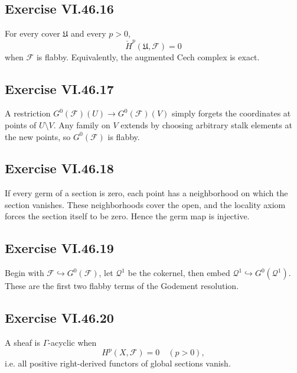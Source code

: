 \subsection*{Exercise VI.46.16}
\begin{solution}
For every cover \(\mathfrak U\) and every \(p>0\),
\[
\check H^p(\mathfrak U,\mathcal F)=0
\]
when \(\mathcal F\) is flabby.  Equivalently, the augmented Cech complex is exact.
\end{solution}

\subsection*{Exercise VI.46.17}
\begin{solution}
A restriction \(G^0(\mathcal F)(U)\to G^0(\mathcal F)(V)\) simply forgets the coordinates at points of \(U\setminus V\).  Any family on \(V\) extends by choosing arbitrary stalk elements at the new points, so \(G^0(\mathcal F)\) is flabby.
\end{solution}

\subsection*{Exercise VI.46.18}
\begin{solution}
If every germ of a section is zero, each point has a neighborhood on which the section vanishes.  These neighborhoods cover the open, and the locality axiom forces the section itself to be zero.  Hence the germ map is injective.
\end{solution}

\subsection*{Exercise VI.46.19}
\begin{solution}
Begin with \(\mathcal F\hookrightarrow G^0(\mathcal F)\), let \(\mathcal Q^1\) be the cokernel, then embed \(\mathcal Q^1\hookrightarrow G^0(\mathcal Q^1)\).  These are the first two flabby terms of the Godement resolution.
\end{solution}

\subsection*{Exercise VI.46.20}
\begin{solution}
A sheaf is \(\Gamma\)-acyclic when
\[
H^p(X,\mathcal F)=0\quad(p>0),
\]
i.e. all positive right-derived functors of global sections vanish.
\end{solution}

